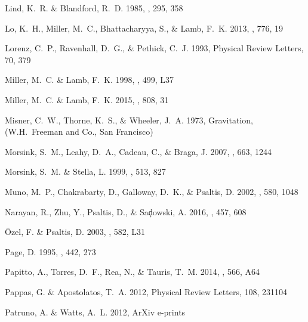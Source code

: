 \documentclass{aa}
\begin{document}
\begin{thebibliography}{63}
{Lind}, K.~R. \& {Blandford}, R.~D. 1985, \apj, 295, 358

{Lo}, K.~H., {Miller}, M.~C., {Bhattacharyya}, S., \& {Lamb}, F.~K. 2013, \apj,
  776, 19

{Lorenz}, C.~P., {Ravenhall}, D.~G., \& {Pethick}, C.~J. 1993, Physical Review
  Letters, 70, 379

{Miller}, M.~C. \& {Lamb}, F.~K. 1998, \apjl, 499, L37

{Miller}, M.~C. \& {Lamb}, F.~K. 2015, \apj, 808, 31

{Misner}, C.~W., {Thorne}, K.~S., \& {Wheeler}, J.~A. 1973, Gravitation, (W.H.~Freeman and Co., San Francisco)

{Morsink}, S.~M., {Leahy}, D.~A., {Cadeau}, C., \& {Braga}, J. 2007, \apj, 663,
  1244

{Morsink}, S.~M. \& {Stella}, L. 1999, \apj, 513, 827

{Muno}, M.~P., {Chakrabarty}, D., {Galloway}, D.~K., \& {Psaltis}, D. 2002,
  \apj, 580, 1048

{Narayan}, R., {Zhu}, Y., {Psaltis}, D., \& {Sa{\c d}owski}, A. 2016, \mnras,
  457, 608

{{\"O}zel}, F. \& {Psaltis}, D. 2003, \apjl, 582, L31

{Page}, D. 1995, \apj, 442, 273

{Papitto}, A., {Torres}, D.~F., {Rea}, N., \& {Tauris}, T.~M. 2014, \aap, 566,
  A64

{Pappas}, G. \& {Apostolatos}, T.~A. 2012, Physical Review Letters, 108, 231104

{Patruno}, A. \& {Watts}, A.~L. 2012, ArXiv e-prints \eprint{[arXiv:1206.2727]}


\end{thebibliography}
\end{document}
